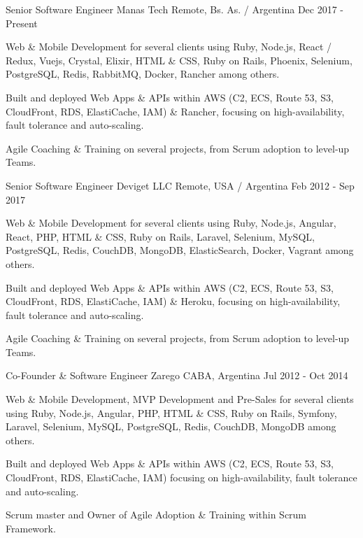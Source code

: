 
\begin{cventries}

  \cventry
    {Senior Software Engineer}
    {Manas Tech}
    {Remote, Bs. As. / Argentina}
    {Dec 2017 -Present }
    {
      \begin{cvitems}
        \item {Web \& Mobile Development for several clients using Ruby, Node.js, React / Redux, Vuejs, Crystal, Elixir, HTML \& CSS, Ruby on Rails, Phoenix, Selenium, PostgreSQL, Redis, RabbitMQ, Docker, Rancher among others.}
        \item {Built and deployed Web Apps \& APIs within AWS (C2, ECS, Route 53, S3, CloudFront, RDS, ElastiCache, IAM) \& Rancher, focusing on high-availability, fault tolerance and auto-scaling.}
        \item {Agile Coaching \& Training on several projects, from Scrum adoption to level-up Teams.}
      \end{cvitems}
    }

  \cventry
    {Senior Software Engineer}
    {Deviget LLC}
    {Remote, USA / Argentina}
    {Feb 2012 - Sep 2017}
    {
      \begin{cvitems}
        \item {Web \& Mobile Development for several clients using Ruby, Node.js, Angular, React, PHP, HTML \& CSS, Ruby on Rails, Laravel, Selenium, MySQL, PostgreSQL, Redis, CouchDB, MongoDB, ElasticSearch, Docker, Vagrant among others.}
        \item {Built and deployed Web Apps \& APIs within AWS (C2, ECS, Route 53, S3, CloudFront, RDS, ElastiCache, IAM) \& Heroku, focusing on high-availability, fault tolerance and auto-scaling.}
        \item {Agile Coaching \& Training on several projects, from Scrum adoption to level-up Teams.}
      \end{cvitems}
    }

  \cventry
    {Co-Founder \& Software Engineer}
    {Zarego}
    {CABA, Argentina}
    {Jul 2012 - Oct 2014}
    {
      \begin{cvitems}
        \item {Web \& Mobile Development, MVP Development and Pre-Sales for several clients using Ruby, Node.js, Angular, PHP, HTML \& CSS, Ruby on Rails, Symfony, Laravel, Selenium, MySQL, PostgreSQL, Redis, CouchDB, MongoDB  among others.}
        \item {Built and deployed Web Apps \& APIs within AWS (C2, ECS, Route 53, S3, CloudFront, RDS, ElastiCache, IAM) focusing on high-availability, fault tolerance and auto-scaling.}
		\item {Scrum master and Owner of Agile Adoption \& Training within Scrum Framework.}
      \end{cvitems}
    }


\end{cventries}
